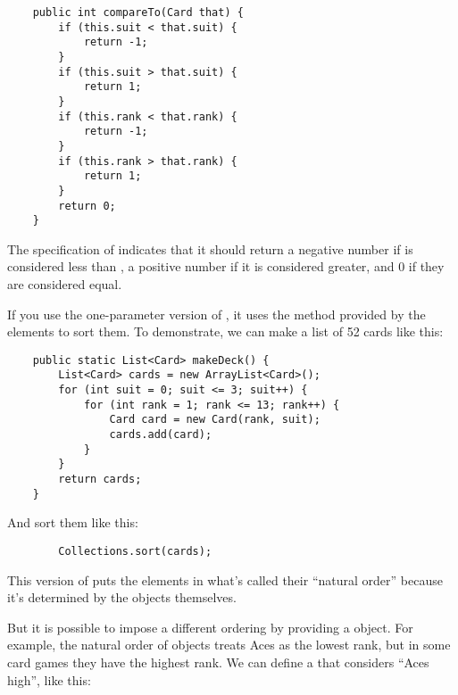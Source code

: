 \documentclass[12pt]{book}
\theoremstyle{exercise}
\begin{document}
\begin{verbatim}
    public int compareTo(Card that) {
        if (this.suit < that.suit) {
            return -1;
        }
        if (this.suit > that.suit) {
            return 1;
        }
        if (this.rank < that.rank) {
            return -1;
        }
        if (this.rank > that.rank) {
            return 1;
        }
        return 0;
    }
\end{verbatim}


The specification of  indicates that it should return
a negative number if  is considered less than
, a positive number if it is considered greater, and 0 if
they are considered equal.

If you use the one-parameter version of , it
uses the  method provided by the elements to sort
them. To demonstrate, we can make a list of 52 cards like this:

\begin{verbatim}
    public static List<Card> makeDeck() {
        List<Card> cards = new ArrayList<Card>();
        for (int suit = 0; suit <= 3; suit++) {
            for (int rank = 1; rank <= 13; rank++) {
                Card card = new Card(rank, suit);
                cards.add(card);
            }
        }
        return cards;
    }
\end{verbatim}

And sort them like this:

\begin{verbatim}
        Collections.sort(cards);
\end{verbatim}

This version of  puts the elements in what's called their
``natural order'' because it's determined by the objects themselves.


But it is possible to impose a different ordering by providing a
 object. For example, the natural order of
 objects treats Aces as the lowest rank, but in some card
games they have the highest rank. We can define a 
that considers ``Aces high'', like this:
\end{document}
